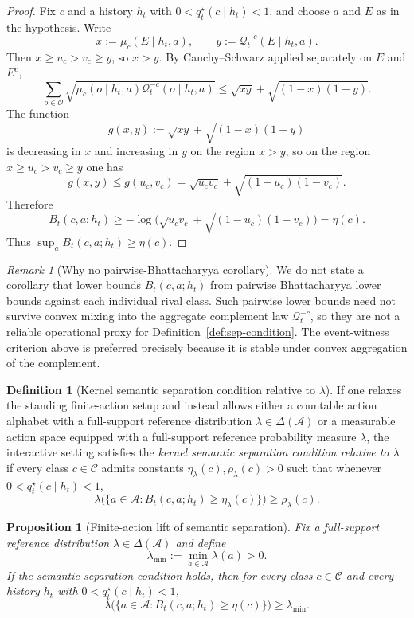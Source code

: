 \documentclass[11pt]{article}
\newtheorem{proposition}[theorem]{Proposition}
\theoremstyle{definition}
\newtheorem{definition}[theorem]{Definition}
\theoremstyle{remark}
\newtheorem{remark}[theorem]{Remark}
\newcommand{\Acal}{\mathcal{A}}
\newcommand{\Ccal}{\mathcal{C}}
\newcommand{\Ocal}{\mathcal{O}}
\newcommand{\Qcal}{\mathcal{Q}}
\begin{document}
\begin{proof}
Fix $c$ and a history $h_t$ with $0<q_t^\star(c\mid h_t)<1$, and choose $a$ and $E$ as in the hypothesis. Write
\[
x:=\mu_c(E\mid h_t,a),
\qquad
y:=\Qcal_t^{-c}(E\mid h_t,a).
\]
Then $x\ge u_c>v_c\ge y$, so $x>y$. By Cauchy--Schwarz applied separately on $E$ and $E^c$,
\[
\sum_{o\in\Ocal}\sqrt{\mu_c(o\mid h_t,a)\Qcal_t^{-c}(o\mid h_t,a)}
\le
\sqrt{xy}+\sqrt{(1-x)(1-y)}.
\]
The function
\[
g(x,y):=\sqrt{xy}+\sqrt{(1-x)(1-y)}
\]
is decreasing in $x$ and increasing in $y$ on the region $x>y$, so on the region $x\ge u_c>v_c\ge y$ one has
\[
g(x,y)\le g(u_c,v_c)=\sqrt{u_cv_c}+\sqrt{(1-u_c)(1-v_c)}.
\]
Therefore
\[
B_t(c,a;h_t)
\ge
-\log\!\bigl(\sqrt{u_cv_c}+\sqrt{(1-u_c)(1-v_c)}\bigr)
=\eta(c).
\]
Thus $\sup_a B_t(c,a;h_t)\ge \eta(c)$.
\end{proof}

\begin{remark}[Why no pairwise-Bhattacharyya corollary]
\label{rem:no-pairwise-bhat-corollary}
We do not state a corollary that lower bounds $B_t(c,a;h_t)$ from pairwise Bhattacharyya lower bounds against each individual rival class. Such pairwise lower bounds need not survive convex mixing into the aggregate complement law $\Qcal_t^{-c}$, so they are not a reliable operational proxy for Definition~\ref{def:sep-condition}. The event-witness criterion above is preferred precisely because it is stable under convex aggregation of the complement.
\end{remark}

\begin{definition}[Kernel semantic separation condition relative to $\lambda$]
\label{def:kernel-sep-condition}
If one relaxes the standing finite-action setup and instead allows either a countable action alphabet with a full-support reference distribution $\lambda\in\Delta(\Acal)$ or a measurable action space equipped with a full-support reference probability measure $\lambda$, the interactive setting satisfies the \emph{kernel semantic separation condition relative to $\lambda$} if every class $c\in\Ccal$ admits constants $\eta_\lambda(c),\rho_\lambda(c)>0$ such that whenever $0<q_t^\star(c\mid h_t)<1$,
\[
\lambda\!\bigl(\{a\in\Acal:B_t(c,a;h_t)\ge \eta_\lambda(c)\}\bigr)\ge \rho_\lambda(c).
\]
\end{definition}

\begin{proposition}[Finite-action lift of semantic separation]
\label{prop:finite-action-kernel-separation}
Fix a full-support reference distribution $\lambda\in\Delta(\Acal)$ and define
\[
\lambda_{\min}:=\min_{a\in\Acal}\lambda(a)>0.
\]
If the semantic separation condition holds, then for every class $c\in\Ccal$ and every history $h_t$ with $0<q_t^\star(c\mid h_t)<1$,
\[
\lambda\!\bigl(\{a\in\Acal:B_t(c,a;h_t)\ge \eta(c)\}\bigr)\ge \lambda_{\min}.
\]
\end{proposition}
\end{document}
